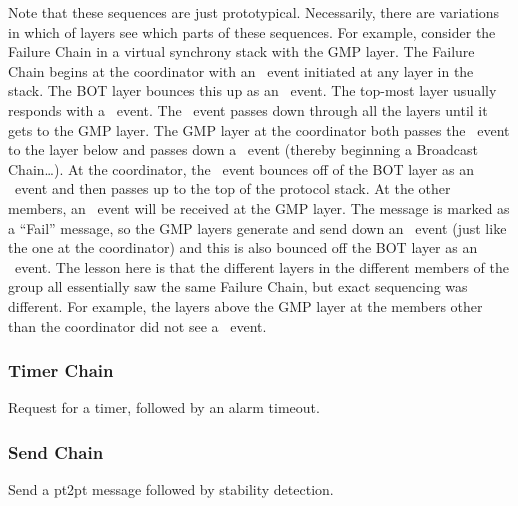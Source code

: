 Note that these sequences are just prototypical.  Necessarily, there
are variations in which of layers see which parts of these sequences.
For example, consider the Failure Chain in a virtual synchrony stack
with the GMP layer.  The Failure Chain begins at the coordinator with
an \ESuspect\ event initiated at any layer in the stack.  The BOT
layer bounces this up as an \ESuspect\ event.  The top-most layer
usually responds with a \EFail\ event.  The \EFail\ event passes
down through all the layers until it gets to the GMP layer.  The GMP layer
at the coordinator both passes the \EFail\ event to the layer below
and passes down a \ECast\ event (thereby beginning a Broadcast
Chain\ldots).  At the coordinator, the \EFail\ event bounces off of
the BOT layer as an \EFail\ event and then passes up to the top of the
protocol stack.  At the other members, an \ECast\ event will be received
at the GMP layer.  The message is marked as a ``Fail'' message, so the
GMP layers generate and send down an \EFail\ event (just like the one
at the coordinator) and this is also bounced off the BOT layer as an
\EFail\ event.  The lesson here is that the different layers in the
different members of the group all essentially saw the same Failure
Chain, but exact sequencing was different.  For example, the layers
above the GMP layer at the members other than the coordinator did not
see a \EFail\ event. 


\subsubsection{Timer Chain}
Request for a timer, followed by an alarm timeout.
\begin{ChainTable}
\end{ChainTable}

\subsubsection{Send Chain}
Send a pt2pt message followed by stability detection.
\begin{ChainTable}
\end{ChainTable}

